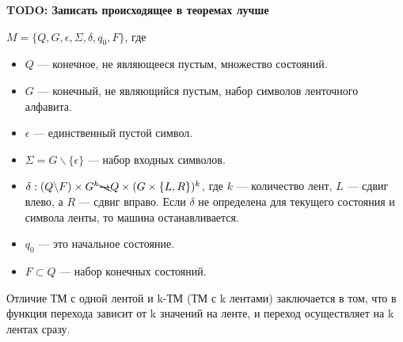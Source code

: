     \par \textbf{TODO: Записать происходящее в теоремах лучше}
    \begin{Def}
    $M = \{Q, G, \epsilon, \Sigma, \delta, q_0, F\}$, где
    \begin{itemize}
        \item $Q$ --- конечное, не являющееся пустым, множество состояний.
        \item $G$ --- конечный, не являющийся пустым, набор символов ленточного алфавита.
        \item $\epsilon$ --- единственный пустой символ.
        \item $\Sigma = G \backslash \{\epsilon\}$ --- набор входных символов.
        \item $\delta : (Q \backslash F) \times G^k \bcancel{\rightarrow}
        Q \times (G \times \{L, R\})^k$, где $k$ --- количество лент, $L$ --- сдвиг влево, а $R$ --- сдвиг вправо. Если $\delta$ не определена для текущего состояния и символа ленты, то машина останавливается.
        \item $q_0$ --- это начальное состояние.
        \item $F \subset {Q}$  --- набор конечных состояний.
    \end{itemize}
    \end{Def}
    \begin{Rem}
        Отличие ТМ с одной лентой и k-ТМ (ТМ с k лентами) заключается в том, что в функция перехода зависит от k значений на ленте, и переход осуществляет на k лентах сразу.
    \end{Rem}


